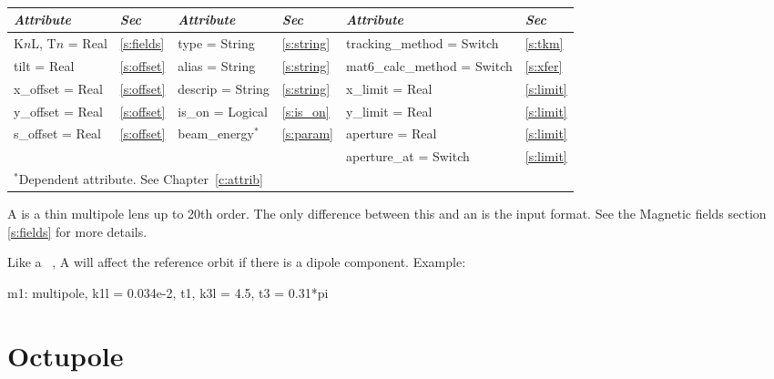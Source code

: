 {{\begin{center}
\tt
\begin{tabular}{|l|l||l|l||l|l|} \hline
  {\sl Attribute} & {\sl Sec}  & {\sl Attribute} & {\sl Sec} & {\sl Attribute} & {\sl Sec} \\ \hline
  K$n$L, T$n$ = Real &  \ref{s:fields} &  type = String       & \ref{s:string} & tracking\_method = Switch   & \ref{s:tkm}   \\ \hline
  tilt       = Real  &  \ref{s:offset} &  alias = String      & \ref{s:string} & mat6\_calc\_method = Switch & \ref{s:xfer}  \\ \hline
  x\_offset  = Real  &  \ref{s:offset} &  descrip = String    & \ref{s:string} & x\_limit = Real             & \ref{s:limit} \\ \hline
  y\_offset  = Real  &  \ref{s:offset} &  is\_on = Logical    & \ref{s:is_on}  & y\_limit = Real             & \ref{s:limit} \\ \hline
  s\_offset  = Real  &  \ref{s:offset} &  beam\_energy$^*$    & \ref{s:param}  & aperture = Real             & \ref{s:limit} \\ \hline
                     &                 &                      &                & aperture\_at = Switch       & \ref{s:limit} \\ \hline
  \multicolumn{6}{l}{\small $^*$Dependent attribute. See Chapter~\ref{c:attrib}} \\
\end{tabular}
\end{center}
\toffset

A  is a thin multipole lens up to 20th order. The only
difference between this and an  is the input format. See the 
Magnetic fields section \ref{s:fields} for more details.

Like a \mad\ , A \bmad {} will affect the
reference orbit if there is a dipole component. 
Example:
\begin{example}
  m1: multipole, k1l = 0.034e-2, t1, k3l = 4.5, t3 = 0.31*pi
\end{example}

\section{Octupole}
\label{s:oct}

}}

